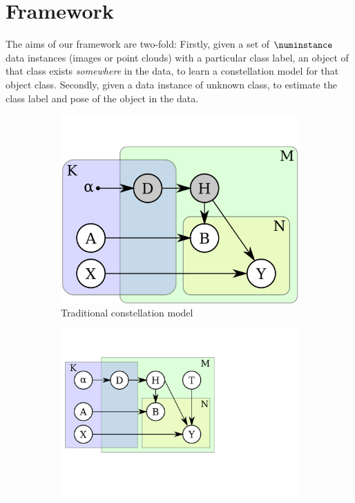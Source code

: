 \section{Framework}
\label{sec:framework}
The aims of our framework are two-fold:
Firstly, given a set of $\numinstance$ data instances (\eg images or point clouds) with a particular class label, \ie an object of that class exists \emph{somewhere} in the data, to learn a constellation model for that object class.
Secondly, given a data instance of unknown class, to estimate the class label and pose of the object in the data.
\begin{figure}[ht]
\centering
\begin{subfigure}[b]{0.33\linewidth}
	\includegraphics[width=\linewidth]{fig/3dreg/graphicalModelNoPose.pdf}
	\caption{Traditional constellation model}	
	\label{fig:graphicalModelNoPose}
\end{subfigure}
\begin{subfigure}[b]{0.33\linewidth}
	\includegraphics[width=\linewidth]{fig/3dreg/graphicalModelNoParticle.pdf}

\end{subfigure}
\end{figure}
